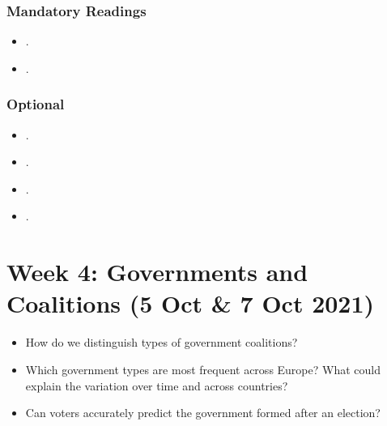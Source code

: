 \documentclass[abstract=on,parskip=full,headings=standardclasses,fontsize=11pt,paper=a4]{scrartcl}
\begin{document}
\subsubsection*{Mandatory Readings}
\begin{itemize}
\item {}.
\item {}.
\end{itemize}


\subsubsection*{Optional}
\begin{itemize}
\item {}.
\item {}.
\item {}.
\item {}.
\end{itemize}





\section{Week 4: Governments and Coalitions (5 Oct \& 7 Oct 2021)}





\begin{itemize}
\renewcommand\labelitemi{--}
\item How do we distinguish types of government coalitions?
\item Which government types are most frequent across Europe?  What could explain the variation over time and across countries?
\item Can voters accurately predict the government formed after an election?
\end{itemize}
\end{document}
